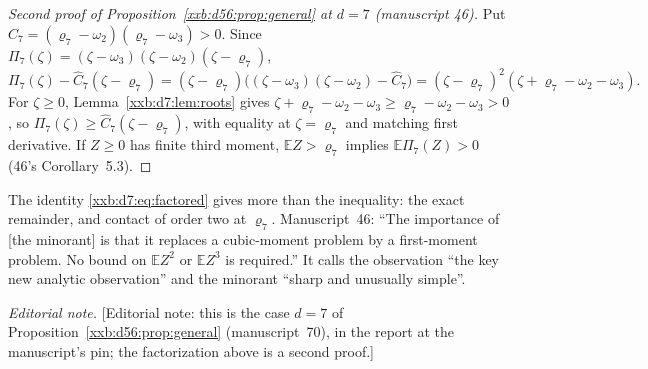 \documentclass[11pt,a4paper]{article}
\numberwithin{equation}{section}
\theoremstyle{definition}
\theoremstyle{remark}
\theoremstyle{plain}
\begin{document}
\begin{proof}[Second proof of Proposition~\ref{xxb:d56:prop:general} at $d=7$ (manuscript 46)]
Put $\widehat C_7=(\varrho_7-\omega_2)(\varrho_7-\omega_3)>0$.  Since
$\Pi_7(\zeta)=(\zeta-\omega_3)(\zeta-\omega_2)(\zeta-\varrho_7)$,
\begin{equation}\label{xxb:d7:eq:factored}
 \Pi_7(\zeta)-\widehat C_7(\zeta-\varrho_7)
 =(\zeta-\varrho_7)\bigl((\zeta-\omega_3)(\zeta-\omega_2)-\widehat C_7\bigr)
 =(\zeta-\varrho_7)^2(\zeta+\varrho_7-\omega_2-\omega_3).
\end{equation}
For $\zeta\ge0$, Lemma~\ref{xxb:d7:lem:roots} gives
$\zeta+\varrho_7-\omega_2-\omega_3\ge\varrho_7-\omega_2-\omega_3>0$, so
$\Pi_7(\zeta)\ge\widehat C_7(\zeta-\varrho_7)$, with equality at
$\zeta=\varrho_7$ and matching first derivative.  If $Z\ge0$ has finite third
moment, $\mathbb E Z>\varrho_7$ implies $\mathbb E\Pi_7(Z)>0$ (46's
Corollary~5.3).
\end{proof}
The identity \eqref{xxb:d7:eq:factored} gives more than the inequality: the
exact remainder, and contact of order two at $\varrho_7$.  Manuscript~46:
``The importance of [the minorant] is that it replaces a cubic-moment problem
by a first-moment problem.  No bound on $\mathbb EZ^2$ or $\mathbb EZ^3$ is
required.''  It calls the observation ``the key new analytic observation''
and the minorant ``sharp and unusually simple''.

\emph{Editorial note.}  [Editorial note: this is the case $d=7$ of
Proposition~\ref{xxb:d56:prop:general} (manuscript~70), in the report at the
manuscript's pin; the factorization above is a second proof.]
\end{document}
